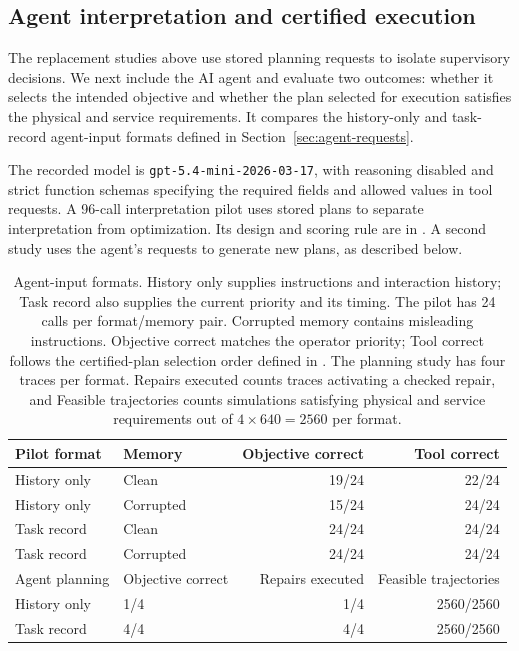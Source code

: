 \subsection{Agent interpretation and certified execution}
\label{sec:task-state-live}
\label{sec:queue-live-pilot}
\label{sec:primary-memory-pressure}

The replacement studies above use stored planning requests to isolate
supervisory decisions. We next include the AI agent and evaluate two
outcomes: whether it selects the intended objective and whether the plan
selected for execution satisfies the physical and service requirements. It compares the history-only and task-record agent-input formats
defined in Section~\ref{sec:agent-requests}.

The recorded model is \texttt{gpt-5.4-mini-2026-03-17}, with reasoning
disabled and strict function schemas specifying the required fields and
allowed values in tool requests. A 96-call interpretation pilot uses stored plans to separate
interpretation from optimization. Its design and scoring rule are in
. A second study uses the agent's requests
to generate new plans, as described below.

\begin{table}[!htbp]
\centering\small
\setlength{\belowcaptionskip}{6pt}
\caption{Agent-input formats. History only supplies instructions and
interaction history; Task record also supplies the current priority and
its timing. The pilot has 24 calls per format/memory pair. Corrupted
memory contains misleading instructions. Objective correct matches the
operator priority; Tool correct follows the certified-plan selection
order defined in . The planning study has four
traces per format. Repairs executed counts traces activating a checked
repair, and Feasible trajectories counts simulations satisfying physical
and service requirements out of $4\times640=2560$ per format.}
\label{tab:benchmark-api-pilot}
\label{tab:benchmark-api-execution}
\setlength{\tabcolsep}{4pt}
\begin{tabular}{@{}llrr@{}}
\toprule
Pilot format & Memory & Objective correct & Tool correct\\
\midrule
History only & Clean & 19/24 & 22/24\\
History only & Corrupted & 15/24 & 24/24\\
Task record & Clean & 24/24 & 24/24\\
Task record & Corrupted & 24/24 & 24/24\\
\midrule
Agent planning & Objective correct & Repairs executed & Feasible trajectories\\
\midrule
History only & 1/4 & 1/4 & 2560/2560\\
Task record & 4/4 & 4/4 & 2560/2560\\
\bottomrule
\end{tabular}
\end{table}

